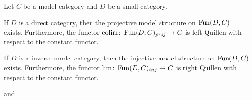 \begin{thm}\label{thm:exProjInjModelStr}
    Let $C$ be a model category and $D$ be a small category.

    If $D$ is a direct category, then the projective model structure on $\operatorname{Fun}(D,C)$ exists. 
    Furthermore, the functor $\operatorname*{colim}\colon\operatorname{Fun}(D,C)_{proj}\to C$ is left Quillen with respect to the constant functor.

    If $D$ is a inverse model category, then the injective model structure on $\operatorname{Fun}(D,C)$ exists.
    Furthermore, the functor $\lim\colon\operatorname{Fun}(D,C)_{inj}\to C$ is right Quillen with respect to the constant functor.
    \begin{reference}
        \cite[Theorem 5.1.3]{hovey2007model} and \cite[Corollary 5.1.6]{hovey2007model}
    \end{reference}
\end{thm}
